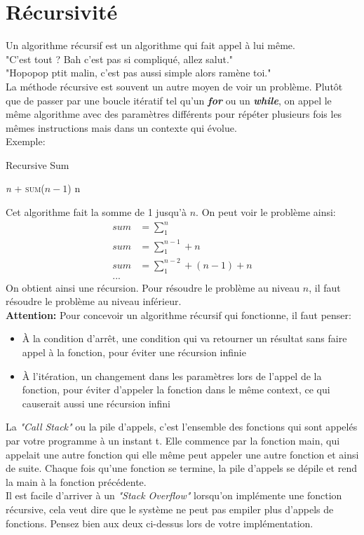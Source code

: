 \documentclass[11pt]{extarticle}
\begin{document}
\section{Récursivité}
Un algorithme récursif est un algorithme qui fait appel à lui même.\\
"C'est tout ? Bah c'est pas si compliqué, allez salut."\\
"Hopopop ptit malin, c'est pas aussi simple alors ramène toi."\\
La méthode récursive est souvent un autre moyen de voir un problème. Plutôt que de passer par une boucle itératif tel qu'un \textit{\textbf{for}} ou un \textit{\textbf{while}}, on appel le même algorithme avec des paramètres différents pour répéter plusieurs fois les mêmes instructions mais dans un contexte qui évolue.\\
Exemple:
\begin{center}
\begin{algorithm}[h]
\caption{Recursive Sum}\label{recursive_sum}
\begin{algorithmic} %
    		\State \Return \textit{n} + \textsc{sum}($\textit{n} - 1$)
    	\EndIf
    	\State \Return n
    \EndFunction
\end{algorithmic}
\end{algorithm}
\end{center}
Cet algorithme fait la somme de 1 jusqu'à $n$. On peut voir le problème ainsi:
\begin{align*}
sum &= \sum_1^n \\
sum &= \sum_1^{n-1} + n \\
sum &= \sum_1^{n-2} + (n-1) + n \\
...
\end{align*}
On obtient ainsi une récursion. Pour résoudre le problème au niveau $n$, il faut résoudre le problème au niveau inférieur.\\
\textbf{Attention:} Pour concevoir un algorithme récursif qui fonctionne, il faut penser:
\begin{itemize}
\item À la condition d'arrêt, une condition qui va retourner un résultat sans faire appel à la fonction, pour éviter une récursion infinie
\item À l'itération, un changement dans les paramètres lors de l'appel de la fonction, pour éviter d'appeler la fonction dans le même context, ce qui causerait aussi une récursion infini
\end{itemize}
La \textit{"Call Stack"} ou la pile d'appels, c'est l'ensemble des fonctions qui sont appelés par votre programme à un instant t. Elle commence par la fonction main, qui appelait une autre fonction qui elle même peut appeler une autre fonction et ainsi de suite. Chaque fois qu'une fonction se termine, la pile d'appels se dépile et rend la main à la fonction précédente.\\
Il est facile d'arriver à un \textit{"Stack Overflow"} lorsqu'on implémente une fonction récursive, cela veut dire que le système ne peut pas empiler plus d'appels de fonctions. Pensez bien aux deux ci-dessus lors de votre implémentation.
\end{document}
